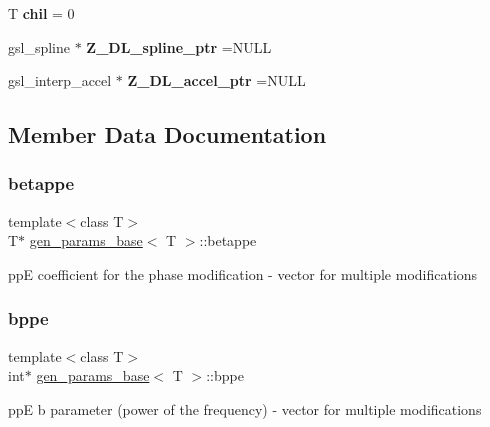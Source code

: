\begin{DoxyCompactItemize}
\mbox{\label{classgen__params__base_a54b56e9532a0b4b6dcb48d2454da7d93}} 
T {\bfseries chil} = 0
\item 
\mbox{\label{classgen__params__base_a551ef3f246f186bf3ff1f4b51a40b465}} 
gsl\+\_\+spline $\ast$ {\bfseries Z\+\_\+\+D\+L\+\_\+spline\+\_\+ptr} =N\+U\+LL
\item 
\mbox{\label{classgen__params__base_aabdb7823d0d6c98a79e6f16c63ceff63}} 
gsl\+\_\+interp\+\_\+accel $\ast$ {\bfseries Z\+\_\+\+D\+L\+\_\+accel\+\_\+ptr} =N\+U\+LL
\end{DoxyCompactItemize}


\subsection{Member Data Documentation}
\mbox{\label{classgen__params__base_ac0442682283e1e71d8c1410b99f50fe3}} 
\subsubsection{\texorpdfstring{betappe}{betappe}}
{\footnotesize\ttfamily template$<$class T$>$ \\
T$\ast$ \hyperlink{classgen__params__base}{gen\+\_\+params\+\_\+base}$<$ T $>$\+::betappe}

ppE coefficient for the phase modification -\/ vector for multiple modifications \mbox{\label{classgen__params__base_a6ef4d26715ba4696f2fa60acf9930a41}} 
\subsubsection{\texorpdfstring{bppe}{bppe}}
{\footnotesize\ttfamily template$<$class T$>$ \\
int$\ast$ \hyperlink{classgen__params__base}{gen\+\_\+params\+\_\+base}$<$ T $>$\+::bppe}

ppE b parameter (power of the frequency) -\/ vector for multiple modifications \mbox{\label{classgen__params__base_a1028e164a2ee18b60d4ae902165aefea}} 
